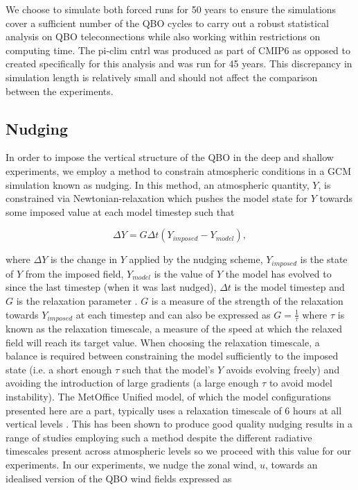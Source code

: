 We choose to simulate both forced runs for 50 years to ensure the simulations cover a sufficient number of the QBO cycles to carry out a robust statistical analysis on QBO teleconnections while also working within restrictions on computing time. The pi-clim cntrl was produced as part of CMIP6 as opposed to created specifically for this analysis and was run for 45 years. This discrepancy in simulation length is relatively small and should not affect the comparison between the experiments. 



\subsection{Nudging}
In order to impose the vertical structure of the QBO in the deep and shallow experiments, we employ a method to constrain atmospheric conditions in a GCM simulation known as nudging. In this method, an atmospheric quantity, $Y$, is constrained via Newtonian-relaxation which pushes the model state for $Y$ towards some imposed value at each model timestep such that

\begin{equation} \label{eq:nudging}
\Delta Y = G \Delta t (Y_{imposed} - Y_{model}), 
\end{equation}

\noindent where $\Delta Y$ is the change in $Y$ applied by the nudging scheme, $Y_{imposed}$ is the state of $Y$ from the imposed field, $Y_{model}$ is the value of $Y$ the model has evolved to since the last timestep (when it was last nudged), $\Delta t$ is the model timestep and $G$ is the relaxation parameter \citep{telfordTechnical2008}. $G$ is a measure of the strength of the relaxation towards $Y_{imposed}$ at each timestep and can also be expressed as $G = \frac{1}{\tau}$ where $\tau$ is known as the relaxation timescale, a measure of the speed at which the relaxed field will reach its target value. When choosing the relaxation timescale, a balance is required between constraining the model sufficiently to the imposed state (i.e. a short enough $\tau$ such that the model's $Y$ avoids evolving freely) and avoiding the introduction of large gradients (a large enough $\tau$ to avoid model instability). The MetOffice Unified model, of which the model configurations presented here are a part, typically uses a relaxation timescale of 6 hours at all vertical levels \citep{telfordTechnical2008}. This has been shown to produce good quality nudging results in a range of studies employing such a method despite the different radiative timescales present across atmospheric levels \citep{grayForecasting2020a} so we proceed with this value for our experiments. In our experiments, we nudge the zonal wind, $u$, towards an idealised version of the QBO wind fields expressed as 

